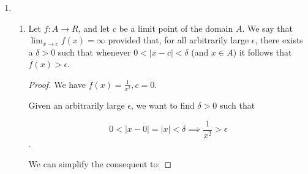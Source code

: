 \documentclass[12pt,letterpaper]{article}
\begin{document}
\begin{enumerate}[label=Exercise 4.2.\arabic*]
\begin{proof}
        If $\lim_{x \to c} g(x) = 0$,
        then we know that for any $\epsilon > 0$, there exists some $\delta > 0$,
        such that $0 < \left|x - c\right| < \delta \implies \left|g(x) - 0\right| = \left|g(x)\right| < \epsilon$.

        We can choose $\epsilon_0 = \frac{\epsilon}{M}$, and we have some $\delta_0$ such that:

        $0 < \left|x - c\right| < \delta_0 \implies \left|g(x)\right| < \frac{\epsilon_0}{M}$.

        From this we can show:
        \begin{align*}
          \left|g(x)\right| &< \frac{\epsilon}{M} \\
          \left|g(x)\right|\left|f(x)\right| &< \left(\frac{\epsilon}{M}\right)M \\
          \left|g(x)\right|\left|f(x)\right| &< \epsilon \\
          \left|g(x) f(x)\right| &< \epsilon \\
          \left|g(x) f(x) - 0\right| &< \epsilon \\
        \end{align*}

        So, $\lim_{x \to c} g(x)f(x) = 0$.

        Thus, if $\lim_{x \to c} g(x) = 0$, then $\lim_{x \to c}g(x)f(x) = 0$ as well.
      \end{proof}

    \item

      \begin{enumerate}
        \item

          Let $f : A \to R$, and let $c$ be a limit point of the domain $A$.
          We say that $\lim_{x \to c} f(x) = \infty$ provided that, for all arbitrarily large $\epsilon$, there exists a $\delta > 0$
          such that whenever $0 < |x - c| < \delta$ (and $x \in A$) it follows that $f(x) > \epsilon$.

          \begin{proof}
            We have $f(x) = \frac{1}{x^2}, c = 0$.

            Given an arbitrarily large $\epsilon$,
            we want to find $\delta > 0$ such that

            \[
              0 < \left|x - 0\right| = \left|x\right| < \delta \implies \frac{1}{x^2} > \epsilon
            \].

            We can simplify the consequent to:


\end{proof}
\end{enumerate}
\end{enumerate}
\end{document}
